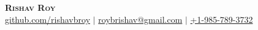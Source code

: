 \documentclass[letterpaper,11pt]{article}
\begin{document}
\begin{center}
    \textbf{\Huge \scshape Rishav Roy} \\ \vspace{1pt}
    \small  
    \href{https://github.com/rishavbroy}{{github.com/rishavbroy}} $|$ 
    \href{mailto:roybrishav@gmail.com}{{roybrishav@gmail.com}} $|$
    \href{tel:19857893732}{+1-985-789-3732}
\end{center}

\vspace{-1mm}

\vspace{-6.5mm}
\end{document}
